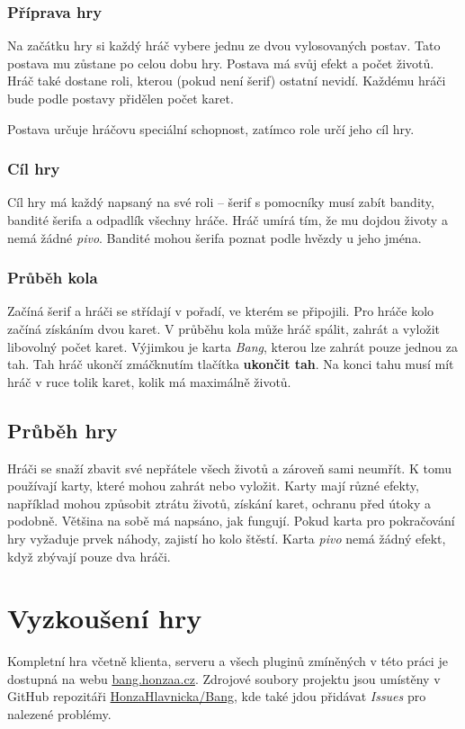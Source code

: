 \subsubsection{Příprava hry}
Na začátku hry si každý hráč vybere jednu ze dvou vylosovaných postav. Tato postava mu zůstane po celou dobu hry. Postava má svůj efekt a počet životů. Hráč také dostane roli, kterou (pokud není šerif) ostatní nevidí. Každému hráči bude podle postavy přidělen počet karet.

Postava určuje hráčovu speciální schopnost, zatímco role určí jeho cíl hry.
\subsubsection{Cíl hry}
Cíl hry má každý napsaný na své roli -- šerif s pomocníky musí zabít bandity, bandité šerifa a odpadlík všechny hráče. Hráč umírá tím, že mu dojdou životy a nemá žádné \emph{pivo}. Bandité mohou šerifa poznat podle hvězdy u jeho jména.

\subsubsection{Průběh kola}
Začíná šerif a hráči se střídají v pořadí, ve kterém se připojili. Pro hráče kolo začíná získáním dvou karet. V průběhu kola může hráč spálit, zahrát a vyložit libovolný počet karet. Výjimkou je karta \emph{Bang}, kterou lze zahrát pouze jednou za tah. Tah hráč ukončí zmáčknutím tlačítka \textbf{ukončit tah}. Na konci tahu musí mít hráč  v ruce tolik karet, kolik má maximálně životů.

\subsection{Průběh hry}
Hráči se snaží zbavit své nepřátele všech životů a zároveň sami neumřít. K tomu používají karty, které mohou zahrát nebo vyložit. Karty mají různé efekty, například mohou způsobit ztrátu životů, získání karet, ochranu před útoky a podobně. Většina na sobě má napsáno, jak fungují. Pokud karta pro pokračování hry vyžaduje prvek náhody, zajistí ho kolo štěstí. Karta \emph{pivo} nemá žádný efekt, když zbývají pouze dva hráči.

\section{Vyzkoušení hry}
Kompletní hra včetně klienta, serveru a všech pluginů zmíněných v této práci je dostupná na webu \href{https://bang.honzaa.cz}{\url{bang.honzaa.cz}}. Zdrojové soubory projektu jsou umístěny v GitHub repozitáři \href{https://github.com/honzahlavnicka/bang}{HonzaHlavnicka/Bang}, kde také jdou přidávat \emph{Issues} pro nalezené problémy.


